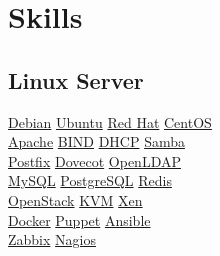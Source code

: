 \documentclass[]{deedy-resume-openfont}
\begin{document}
\begin{minipage}[t]{0.33\textwidth}

\section{Skills}
\subsection{Linux Server}
\href{http://www.debian.org/}{Debian} \textbullet{}
\href{http://www.ubuntu.com/}{Ubuntu} \textbullet{}
\href{http://www.redhat.com/}{Red Hat} \textbullet{}
\href{http://www.centos.org/}{CentOS} \\
\href{http://httpd.apache.org/}{Apache} \textbullet{}
\href{https://www.isc.org/downloads/bind/}{BIND} \textbullet{}
\href{https://www.isc.org/downloads/dhcp/}{DHCP} \textbullet{}
\href{https://www.samba.org/}{Samba} \\
\href{http://www.postfix.org/}{Postfix} \textbullet{}
\href{http://www.dovecot.org/}{Dovecot} \textbullet{}
\href{http://www.openldap.org/}{OpenLDAP} \\
\href{https://www.mysql.com/}{MySQL} \textbullet{}
\href{http://www.postgresql.org/}{PostgreSQL} \textbullet{}
\href{http://redis.io/}{Redis} \\
\href{http://openstack.org/}{OpenStack} \textbullet{}
\href{http://www.linux-kvm.org/}{KVM} \textbullet{}
\href{http://xenproject.org/}{Xen} \\
\href{http://www.docker.com/}{Docker} \textbullet {}
\href{http://puppetlabs.com/}{Puppet} \textbullet{}
\href{https://www.ansible.com/}{Ansible} \\
\href{http://www.zabbix.com/}{Zabbix} \textbullet{}
\href{http://www.nagios.com/}{Nagios} \\
\sectionsep


\end{minipage}
\end{document}
